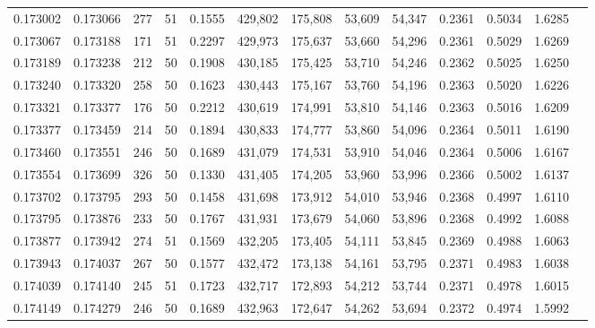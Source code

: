 \begin{tabular}{rrrrrrrrrrrrr}
0.173002 & 0.173066 &   277 &  51 &                                     0.1555 & 429,802 & 175,808 &  53,609 &  54,347 & 0.2361 & 0.5034 & 1.6285 \\
0.173067 & 0.173188 &   171 &  51 &                                     0.2297 & 429,973 & 175,637 &  53,660 &  54,296 & 0.2361 & 0.5029 & 1.6269 \\
0.173189 & 0.173238 &   212 &  50 &                                     0.1908 & 430,185 & 175,425 &  53,710 &  54,246 & 0.2362 & 0.5025 & 1.6250 \\
0.173240 & 0.173320 &   258 &  50 &                                     0.1623 & 430,443 & 175,167 &  53,760 &  54,196 & 0.2363 & 0.5020 & 1.6226 \\
0.173321 & 0.173377 &   176 &  50 &                                     0.2212 & 430,619 & 174,991 &  53,810 &  54,146 & 0.2363 & 0.5016 & 1.6209 \\
0.173377 & 0.173459 &   214 &  50 &                                     0.1894 & 430,833 & 174,777 &  53,860 &  54,096 & 0.2364 & 0.5011 & 1.6190 \\
0.173460 & 0.173551 &   246 &  50 &                                     0.1689 & 431,079 & 174,531 &  53,910 &  54,046 & 0.2364 & 0.5006 & 1.6167 \\
0.173554 & 0.173699 &   326 &  50 &                                     0.1330 & 431,405 & 174,205 &  53,960 &  53,996 & 0.2366 & 0.5002 & 1.6137 \\
0.173702 & 0.173795 &   293 &  50 &                                     0.1458 & 431,698 & 173,912 &  54,010 &  53,946 & 0.2368 & 0.4997 & 1.6110 \\
0.173795 & 0.173876 &   233 &  50 &                                     0.1767 & 431,931 & 173,679 &  54,060 &  53,896 & 0.2368 & 0.4992 & 1.6088 \\
0.173877 & 0.173942 &   274 &  51 &                                     0.1569 & 432,205 & 173,405 &  54,111 &  53,845 & 0.2369 & 0.4988 & 1.6063 \\
0.173943 & 0.174037 &   267 &  50 &                                     0.1577 & 432,472 & 173,138 &  54,161 &  53,795 & 0.2371 & 0.4983 & 1.6038 \\
0.174039 & 0.174140 &   245 &  51 &                                     0.1723 & 432,717 & 172,893 &  54,212 &  53,744 & 0.2371 & 0.4978 & 1.6015 \\
0.174149 & 0.174279 &   246 &  50 &                                     0.1689 & 432,963 & 172,647 &  54,262 &  53,694 & 0.2372 & 0.4974 & 1.5992 \\

\end{tabular}
